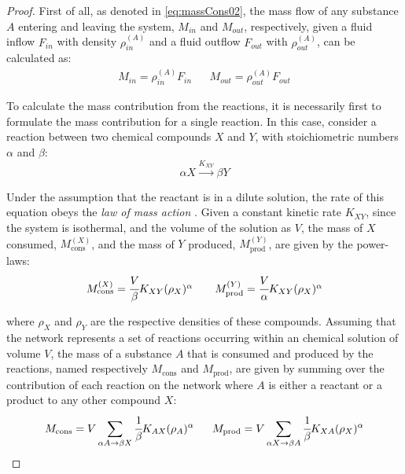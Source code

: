 \documentclass[a4paper,11pt]{book}
\numberwithin{figure}{chapter}
\numberwithin{equation}{chapter}
\numberwithin{table}{chapter}
\theoremstyle{definition}
\begin{document}
\begin{proof}
    First of all, as denoted in \eqref{eq:massCons02}, the mass flow of any substance $A$ entering and leaving the system, $M_{in}$ and $M_{out}$, respectively, given a fluid inflow $F_{in}$ with density $\rho^{(A)}_{in}$ and a fluid outflow $F_{out}$ with $\rho^{(A)}_{out}$, can be calculated as:
    \begin{equation}
    	\begin{matrix}
    		M_{in} = \rho^{(A)}_{in} F_{in} & & M_{out} = \rho^{(A)}_{out} F_{out}
    	\end{matrix}
    \end{equation}
    
    To calculate the mass contribution from the reactions, it is necessarily first to formulate the mass contribution for a single reaction. In this case, consider a reaction between two chemical compounds $X$ and $Y$, with stoichiometric numbers $\alpha$ and $\beta$:
    \begin{equation} \label{eq:simpleEq01}
    	\alpha X \overset{K_{XY}}{\longrightarrow} \beta Y
    \end{equation}
    
    Under the assumption that the reactant is in a dilute solution, the rate of this equation obeys the \textit{law of mass action} \cite{Horn:1972}. Given a constant kinetic rate $K_{XY}$, since the system is isothermal, and the volume of the solution as $V$, the mass of $X$ consumed, $M^{(X)}_\text{cons}$, and the mass of $Y$ produced, $M^{(Y)}_\text{prod}$, are given by the power-laws:
    \begin{equation}
    	\begin{matrix}
    		M^{(X)}_\text{cons} = \cfrac{V}{\beta} K_{XY} (\rho_X)^{\alpha} & & M^{(Y)}_\text{prod} = \cfrac{V}{\alpha} K_{XY} (\rho_X)^{\alpha}
    	\end{matrix}
    \end{equation}
    
    \noindent where $\rho_X$ and $\rho_Y$ are the respective densities of these compounds. Assuming that the network represents a set of reactions occurring within an chemical solution of volume $V$, the mass of a substance $A$ that is consumed and produced by the reactions, named respectively $M_\text{cons}$ and $M_\text{prod}$, are given by summing over the contribution of each reaction on the network where $A$ is either a reactant or a product to any other compound $X$:
    \begin{equation}
    		M_\text{cons} = V \sum_{\alpha A \rightarrow \beta X} \cfrac{1}{\beta} K_{AX} (\rho_A)^{\alpha}\ \ \ \ \  M_\text{prod} = V \sum_{\alpha X \rightarrow \beta A} \cfrac{1}{\beta} K_{XA} (\rho_X)^{\alpha}
    \end{equation}
    

\end{proof}
\end{document}
